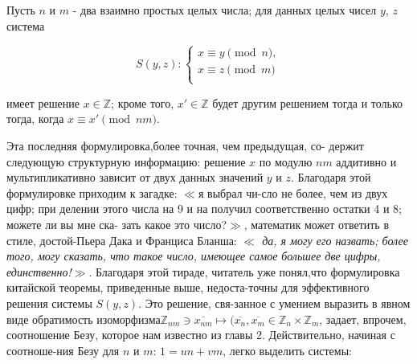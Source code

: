 \documentclass{mai_book}
\begin{document}
\begin{thm}

  Пусть $n$ и $m$ - два взаимно простых целых числа; для данных целых \linebreak чисел $y$, $z$ система

\begin{equation*}
S(y, z) : 
\begin{cases}
    x \equiv y\pmod{n}, \\
    x \equiv z\pmod{m} \\
\end{cases}
\end{equation*}

имеет решение $x \in \mathbb{Z}$; кроме того, $x'\in \mathbb{Z}$ будет другим решением тогда \linebreak и только тогда, когда $x \equiv x'\pmod{nm}$.
\end{thm}
  Эта последняя формулировка,более точная, чем предыдущая, со- \linebreak держит следующую структурную информацию: решение $x$ по модулю \linebreak $nm$ аддитивно и мультипликативно зависит от двух данных значений $y$ и $z$.
  Благодаря этой формулировке приходим к загадке: $\ll$я выбрал чи-\linebreak сло не более, чем из двух цифр; при делении этого числа на 9 и на получил соответственно остатки 4 и 8; можете ли вы мне ска- \linebreak зать какое это число?$\gg$, математик может ответить в стиле, достой-\linebreak Пьера Дака и Франциса Бланша: \textit{$\ll$ да, я могу его назвать; более
того, могу сказать, что такое число, имеющее самое большее две \linebreak цифры, единственно!$\gg$}. Благодаря этой тираде, читатель уже понял,\linebreak что формулировка китайской теоремы, приведенные выше, недоста-\linebreak точны для эффективного решения системы $S(y,z)$. Это решение, свя-\linebreak занное с умением выразить в явном виде обратимость изоморфизма\linebreak $\mathbb{Z}_{nm}\ni \overline{x_{nm}}\mapsto(\overline{x_n},\overline{x_m}\in \mathbb{Z}_n \times\mathbb{Z}_m$, задает, впрочем, соотношение Безу, \linebreak которое нам известно из главы 2. Действительно, начиная с соотноше-\linebreak ния Безу для $n$ и $m$: $1=un+vm$, легко выделить системы:
\end{document}
